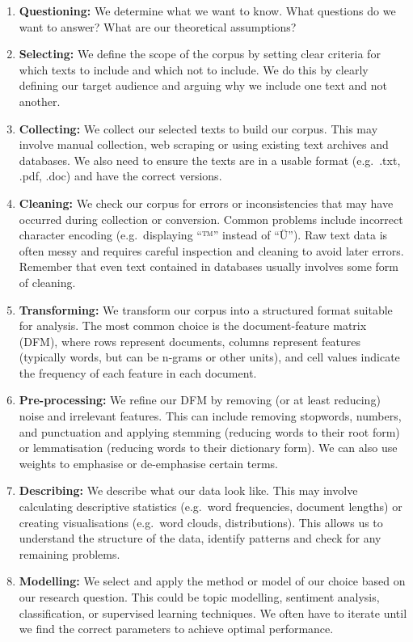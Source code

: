 \documentclass[
]{book}
\begin{document}
\begin{enumerate}
\def\labelenumi{\arabic{enumi}.}
\item
  \textbf{Questioning:} We determine what we want to know. What questions do we want to answer? What are our theoretical assumptions?
\item
  \textbf{Selecting:} We define the scope of the corpus by setting clear criteria for which texts to include and which not to include. We do this by clearly defining our target audience and arguing why we include one text and not another.
\item
  \textbf{Collecting:} We collect our selected texts to build our corpus. This may involve manual collection, web scraping or using existing text archives and databases. We also need to ensure the texts are in a usable format (e.g.~.txt, .pdf, .doc) and have the correct versions.
\item
  \textbf{Cleaning:} We check our corpus for errors or inconsistencies that may have occurred during collection or conversion. Common problems include incorrect character encoding (e.g.~displaying ``™'' instead of ``Ü''). Raw text data is often messy and requires careful inspection and cleaning to avoid later errors. Remember that even text contained in databases usually involves some form of cleaning.
\item
  \textbf{Transforming:} We transform our corpus into a structured format suitable for analysis. The most common choice is the document-feature matrix (DFM), where rows represent documents, columns represent features (typically words, but can be n-grams or other units), and cell values indicate the frequency of each feature in each document.
\item
  \textbf{Pre-processing:} We refine our DFM by removing (or at least reducing) noise and irrelevant features. This can include removing stopwords, numbers, and punctuation and applying stemming (reducing words to their root form) or lemmatisation (reducing words to their dictionary form). We can also use weights to emphasise or de-emphasise certain terms.
\item
  \textbf{Describing:} We describe what our data look like. This may involve calculating descriptive statistics (e.g.~word frequencies, document lengths) or creating visualisations (e.g.~word clouds, distributions). This allows us to understand the structure of the data, identify patterns and check for any remaining problems.
\item
  \textbf{Modelling:} We select and apply the method or model of our choice based on our research question. This could be topic modelling, sentiment analysis, classification, or supervised learning techniques. We often have to iterate until we find the correct parameters to achieve optimal performance.

\end{enumerate}
\end{document}

